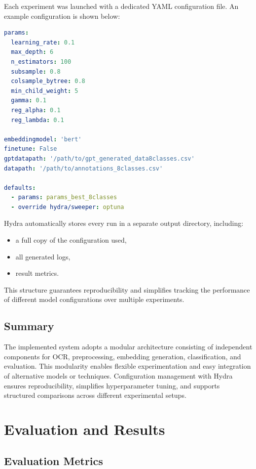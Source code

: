\documentclass{SGGW-thesis-EN}
\begin{document}
Each experiment was launched with a dedicated YAML configuration file. An example configuration is shown below:

\begin{lstlisting}[language=yaml, caption=Sample Hydra configuration]
params:
  learning_rate: 0.1
  max_depth: 6
  n_estimators: 100
  subsample: 0.8
  colsample_bytree: 0.8
  min_child_weight: 5
  gamma: 0.1
  reg_alpha: 0.1
  reg_lambda: 0.1

embeddingmodel: 'bert'
finetune: False
gptdatapath: '/path/to/gpt_generated_data8classes.csv'
datapath: '/path/to/annotations_8classes.csv'

defaults:
  - params: params_best_8classes
  - override hydra/sweeper: optuna
\end{lstlisting}

Hydra automatically stores every run in a separate output directory, including:
\begin{itemize}
  \item a full copy of the configuration used,
  \item all generated logs,
  \item result metrics.
\end{itemize}

This structure guarantees reproducibility and simplifies tracking the performance of different model configurations over multiple experiments.

\section{Summary}

The implemented system adopts a modular architecture consisting of independent components for OCR, preprocessing,
embedding generation, classification, and evaluation. This modularity enables flexible experimentation and easy
integration of alternative models or techniques. Configuration management with Hydra ensures reproducibility,
simplifies hyperparameter tuning, and supports structured comparisons across different experimental setups.

\chapter{Evaluation and Results}

\section{Evaluation Metrics}
\end{document}
